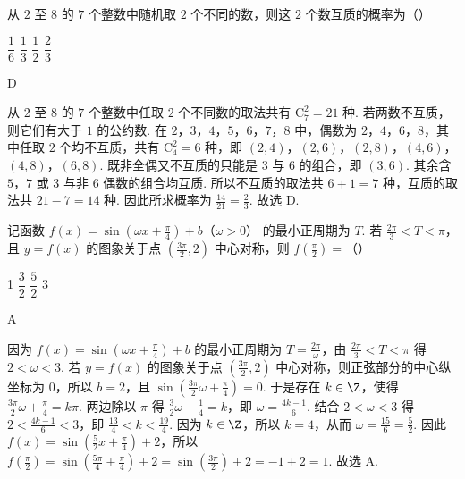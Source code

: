 \begin{problem}
从 \(2\) 至 \(8\) 的 \(7\) 个整数中随机取 \(2\) 个不同的数，则这 \(2\) 个数互质的概率为（\quad）

\choices
    {\(\dfrac16\)}
    {\(\dfrac13\)}
    {\(\dfrac12\)}
    {\(\dfrac23\)}
\end{problem}

\begin{answer}
D
\end{answer}

\begin{solution}
从 \(2\) 至 \(8\) 的 \(7\) 个整数中任取 \(2\) 个不同数的取法共有 \(\mathrm C_7^2=21\) 种. 若两数不互质，则它们有大于 \(1\) 的公约数. 在 \(2\)，\(3\)，\(4\)，\(5\)，\(6\)，\(7\)，\(8\) 中，偶数为 \(2\)，\(4\)，\(6\)，\(8\)，其中任取 \(2\) 个均不互质，共有 \(\mathrm C_4^2=6\) 种，即 \(\left(2,4\right)\)，\(\left(2,6\right)\)，\(\left(2,8\right)\)，\(\left(4,6\right)\)，\(\left(4,8\right)\)，\(\left(6,8\right)\). 既非全偶又不互质的只能是 \(3\) 与 \(6\) 的组合，即 \(\left(3,6\right)\). 其余含 \(5\)，\(7\) 或 \(3\) 与非 \(6\) 偶数的组合均互质. 所以不互质的取法共 \(6+1=7\) 种，互质的取法共 \(21-7=14\) 种. 因此所求概率为 \(\frac{14}{21}=\frac23\). 故选 D.
\end{solution}

\begin{problem}
记函数 \(f(x)=\sin\left(\omega x+\frac{\pi}{4}\right)+b\)（\(\omega>0\)） 的最小正周期为 \(T\). 若 \(\frac{2\pi}{3}<T<\pi\)，且 \(y=f(x)\) 的图象关于点 \(\left(\frac{3\pi}{2},2\right)\) 中心对称，则 \(f\left(\frac{\pi}{2}\right)=\)（\quad）

\choices
    {1}
    {\(\dfrac32\)}
    {\(\dfrac52\)}
    {3}
\end{problem}

\begin{answer}
A
\end{answer}

\begin{solution}
因为 \(f\left(x\right)=\sin\left(\omega x+\frac{\pi}{4}\right)+b\) 的最小正周期为 \(T=\frac{2\pi}{\omega}\)，由 \(\frac{2\pi}{3}<T<\pi\) 得 \(2<\omega<3\). 若 \(y=f\left(x\right)\) 的图象关于点 \(\left(\frac{3\pi}{2},2\right)\) 中心对称，则正弦部分的中心纵坐标为 \(0\)，所以 \(b=2\)，且 \(\sin\left(\frac{3\pi}{2}\omega+\frac{\pi}{4}\right)=0\). 于是存在 \(k\in\Z\)，使得 \(\frac{3\pi}{2}\omega+\frac{\pi}{4}=k\pi\). 两边除以 \(\pi\) 得 \(\frac32\omega+\frac14=k\)，即 \(\omega=\frac{4k-1}{6}\). 结合 \(2<\omega<3\) 得 \(2<\frac{4k-1}{6}<3\)，即 \(\frac{13}{4}<k<\frac{19}{4}\). 因为 \(k\in\Z\)，所以 \(k=4\)，从而 \(\omega=\frac{15}{6}=\frac52\). 因此 \(f\left(x\right)=\sin\left(\frac52x+\frac{\pi}{4}\right)+2\)，所以 \(f\left(\frac{\pi}{2}\right)=\sin\left(\frac{5\pi}{4}+\frac{\pi}{4}\right)+2=\sin\left(\frac{3\pi}{2}\right)+2=-1+2=1\). 故选 A.
\end{solution}

